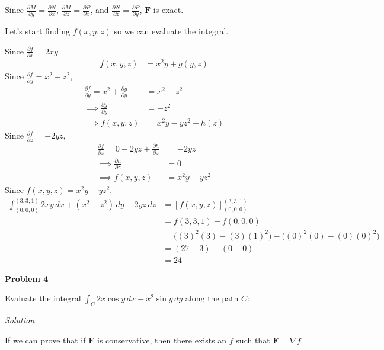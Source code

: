 \documentclass{article}
\newcommand{\lrp}[1]{\left( #1 \right)}
\newcommand{\lrb}[1]{\left[ #1 \right]}
\newcommand{\F}[0]{\mathbf{F}}
\newcommand{\Solution}{\textit{Solution}}
\begin{document}
Since $\displaystyle \frac{\partial M}{\partial y}=\frac{\partial N}{\partial x}$, $\displaystyle \frac{\partial M}{\partial z}=\frac{\partial P}{\partial x}$, and $\displaystyle \frac{\partial N}{\partial z}=\frac{\partial P}{\partial y}$, $\F$ is exact.

Let's start finding $f(x,y,z)$ so we can evaluate the integral.

Since $\displaystyle \frac{\partial f}{\partial x}=2xy$
\begin{align*}
   f(x,y,z)&=x^2y+g(y,z)
\end{align*}
Since $\displaystyle \frac{\partial f}{\partial y}=x^2-z^2$,
\begin{align*}
    \frac{\partial f}{\partial y}=x^2+\frac{\partial g}{\partial y}&=x^2-z^2\\
    \implies \frac{\partial g}{\partial y}&=-z^2\\
    \implies f(x,y,z)&= x^2y -yz^2+h(z)
\end{align*}
Since $\displaystyle \frac{\partial f}{\partial z}=-2yz$,
\begin{align*}
    \frac{\partial f}{\partial z}=0-2yz+\frac{\partial h}{\partial z}&=-2yz\\
    \implies \frac{\partial h}{\partial z}&=0\\
    \implies f(x,y,z)&=x^2y-yz^2\tag{let $C=0$ aka ignore $C$}
\end{align*}
Since $f(x,y,z)=x^2y-yz^2$,
\begin{align*}
    \int_{(0,0,0)}^{(3,3,1)}2xy\,dx+(x^2-z^2)\,dy-2yz\,dz&=\lrb{f(x,y,z)}_{(0,0,0)}^{(3,3,1)}\\
    &=f(3,3,1)-f(0,0,0)\\
    &=\Big((3)^2(3)-(3)(1)^2\Big)-\Big((0)^2(0)-(0)(0)^2\Big)\\
    &=\lrp{27 - 3}-\lrp{0-0}\\
    &=\boxed{24}
\end{align*}
{}\textbf{Problem 4} 

Evaluate the integral $\displaystyle \int_C 2x\cos y\,dx -x^2\sin y\,dy$ along the path $C$:


\Solution

If we can prove that if $\F$ is conservative, then there exists an $f$ such that $\F=\nabla f$.
\end{document}
